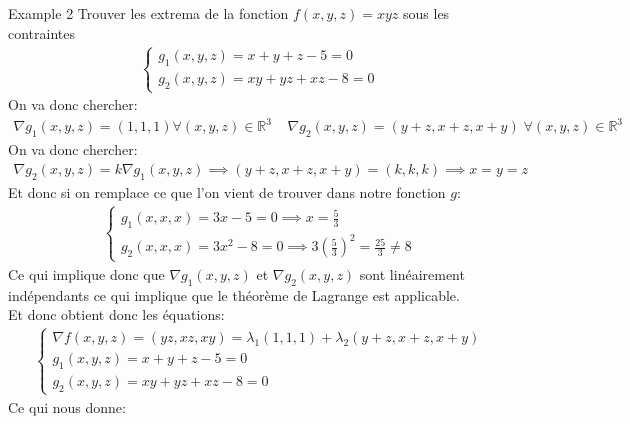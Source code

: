 \begin{parag}{Example 2}
    Trouver les extrema de la fonction $f\left(x, y, z\right) =  xyz$ sous les contraintes 
    \begin{align*} \begin{cases}
        g_1\left(x, y, z\right) = x + y + z - 5 =  0\\
        g_2\left(x, y, z\right) =  xy + yz + xz - 8 =  0
    \end{cases} \end{align*}
    On va donc chercher:
    \begin{align*} \nabla g_1 \left(x, y, z\right) =  \left(1, 1, 1\right) \forall \left(x, y, z\right) \in \mathbb{R}^{3}\; \; \; \; \nabla g_2 \left(x, y, z\right) =  \left(y + z , x + z, x + y\right) \; \forall \left(x, y, z\right) \in \mathbb{R}^{3} \end{align*}
    On va donc chercher:
    \begin{align*} \nabla g_2\left(x, y, z\right) =  k \nabla g_1\left(x, y, z\right) \implies \left(y + z, x + z, x + y\right) = \left(k, k, k\right) \implies x =  y = z \end{align*}
    Et donc si on remplace ce que l'on vient de trouver dans notre fonction $g$:
    \begin{align*} 
        \begin{cases}
            g_1\left(x, x, x\right) =  3x - 5 = 0 \implies x =  \frac{5}{3}\\
            g_2\left(x, x, x\right) =  3x^2 - 8 = 0 \implies 3\left(\frac{5}{3}\right)^2 =  \frac{25}{3} \neq 8
        \end{cases}
    \end{align*}
    Ce qui implique donc que $\nabla g_1\left(x, y, z\right)$ et $\nabla g_2\left(x, y, z\right)$ sont linéairement indépendants ce qui implique que le théorème de Lagrange est applicable.\\
    Et donc obtient donc les équations:
\begin{align*}
    \begin{cases}
        \nabla f\left(x, y, z\right) =  \left(yz, xz, xy\right) =  \lambda_1\left(1, 1, 1\right) + \lambda_2 \left(y + z, x + z, x + y\right)\\
        g_1\left(x, y, z\right) =  x + y + z - 5 =  0\\
        g_2\left(x, y, z\right) =  xy + yz + xz - 8 = 0
    \end{cases}
\end{align*}
Ce qui nous donne:
\begin{align*} 

\end{align*}
\end{parag}
